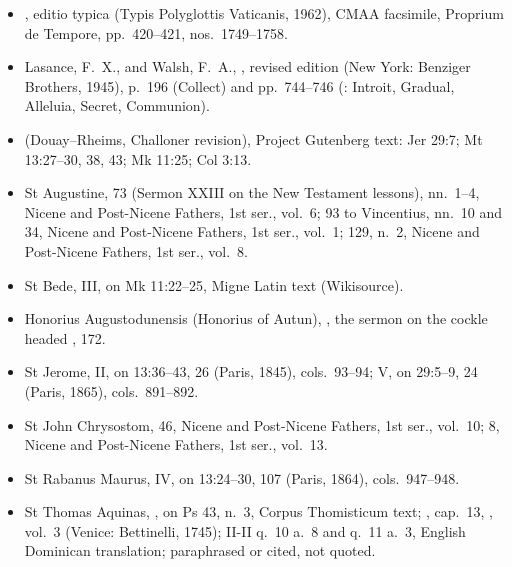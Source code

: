 {\footnotesize
\begin{itemize}\setlength{\itemsep}{0.15em}\setlength{\parskip}{0pt}
\item {}, editio typica (Typis Polyglottis Vaticanis, 1962), CMAA facsimile, Proprium de Tempore, pp.~420--421, nos.~1749--1758.
\item Lasance, F.~X., and Walsh, F.~A., , revised edition (New York: Benziger Brothers, 1945), p.~196 (Collect) and pp.~744--746 (: Introit, Gradual, Alleluia, Secret, Communion).
\item {} (Douay--Rheims, Challoner revision), Project Gutenberg text: Jer 29:7; Mt 13:27--30, 38, 43; Mk 11:25; Col 3:13.
\item St Augustine,  73 (Sermon XXIII on the New Testament lessons), nn.~1--4, Nicene and Post-Nicene Fathers, 1st ser., vol.~6;  93 to Vincentius, nn.~10 and 34, Nicene and Post-Nicene Fathers, 1st ser., vol.~1;  129, n.~2, Nicene and Post-Nicene Fathers, 1st ser., vol.~8.
\item St Bede,  III, on Mk 11:22--25, Migne Latin text (Wikisource).
\item Honorius Augustodunensis (Honorius of Autun), , the sermon on the cockle headed ,  172.
\item St Jerome,  II, on 13:36--43,  26 (Paris, 1845), cols.~93--94;  V, on 29:5--9,  24 (Paris, 1865), cols.~891--892.
\item St John Chrysostom,  46, Nicene and Post-Nicene Fathers, 1st ser., vol.~10;  8, Nicene and Post-Nicene Fathers, 1st ser., vol.~13.
\item St Rabanus Maurus,  IV, on 13:24--30,  107 (Paris, 1864), cols.~947--948.
\item St Thomas Aquinas, , on Ps 43, n.~3, Corpus Thomisticum text; , cap.~13, , vol.~3 (Venice: Bettinelli, 1745);  II-II q.~10 a.~8 and q.~11 a.~3, English Dominican translation; paraphrased or cited, not quoted.
\end{itemize}
\par}
